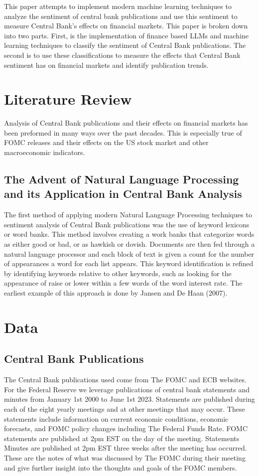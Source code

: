 \documentclass[12pt, letterpaper]{article}
\begin{document}
This paper attempts to implement modern machine learning techniques to analyze the sentiment of central bank publications and use this sentiment to measure Central Bank's effects on financial markets. 
This paper is broken down into two parts. 
First, is the implementation of finance based LLMs and machine learning techniques to classify the sentiment of Central Bank publications. 
The second is to use these classifications to measure the effects that Central Bank sentiment has on financial markets and identify publication trends. 
\section{Literature Review}
Analysis of Central Bank publications and their effects on financial markets has been preformed in many ways over the past decades. This is especially true of FOMC releases and their effects on the US stock market and other macroeconomic indicators. 

\subsection{The Advent of Natural Language Processing and its Application in Central Bank Analysis}
The first method of applying modern Natural Language Processing techniques to sentiment analysis of Central Bank publications was the use of keyword lexicons or word banks. 
This method involves creating a work banks that categorize words as either good or bad, or as hawkish or dovish. 
Documents are then fed through a natural language processor and each block of text is given a count for the number of appearances a word for each list appears. 
This keyword identification is refined by identifying keywords relative to other keywords, such as looking for the appearance of raise or lower within a few words of the word interest rate. 
The earliest example of this approach is done by Jansen and De Haan (2007). 

\section{Data}

\subsection{Central Bank Publications}
The Central Bank publications used come from The FOMC and ECB websites. 
For the Federal Reserve we leverage publications of central bank statements and minutes from January 1st 2000 to June 1st 2023. 
Statements are published during each of the eight yearly meetings and at other meetings that may occur. 
These statements include information on current economic conditions, economic forecasts, and FOMC policy changes including The Federal Funds Rate. 
FOMC statements are published at 2pm EST on the day of the meeting. Statements Minutes are published at 2pm EST three weeks after the meeting has occurred. 
These are the notes of what was discussed by The FOMC during their meeting and give further insight into the thoughts and goals of the FOMC members. 
\end{document}
